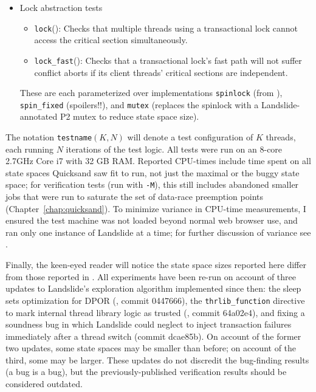 \begin{itemize}
\begin{itemize}
	\end{itemize}
	\item Lock abstraction tests
	\begin{itemize}
		\item {\tt lock}(): Checks that multiple threads using a transactional lock
			cannot access the critical section simultaneously.
		\item {\tt lock\_fast}(): Checks that a transactional lock's fast path will not suffer conflict aborts
			if its client threads' critical sections are independent.
	\end{itemize}
		These are each parameterized over implementations {\tt spinlock} (from \cite{spinlock-rtm-github}),
		{\tt spin\_\allowbreak{}fixed} (spoilers!!),
		and {\tt mutex} (replaces the spinlock with a Landslide-annotated P2 mutex to reduce state space size).
\end{itemize}

The notation {\tt testname}$(K,N)$ will denote a test configuration of $K$ threads, each running $N$ iterations of the test logic.
All tests were run on an 8-core 2.7GHz Core i7 with 32 GB RAM.
Reported CPU-times include time spent on all state spaces
Quicksand saw fit to run,
not just the maximal or the buggy state space;
for verification tests (run with {\tt -M}),
this still includes abandoned smaller jobs that were run to saturate the set of data-race preemption points
(Chapter~\ref{chap:quicksand}).
To minimize variance in CPU-time measurements,
I ensured the test machine was not loaded beyond normal web browser use,
and ran only one instance of Landslide at a time;
for further discussion of variance see \cite{sigbovik-htm}.

Finally, the keen-eyed reader will notice the state space sizes reported here
differ from those reported in \cite{sigbovik-htm}.
All experiments have been re-run
on account of three updates to Landslide's exploration algorithm
implemented since then:
the sleep sets optimization for DPOR (\sect{\ref{sec:landslide-explore}}, commit 0447666),
the {\tt thrlib\_function} directive
to mark internal thread library logic as trusted (\sect{\ref{sec:landslide-config-landslide}}, commit 64a02e4),
and fixing a soundness bug in which Landslide could neglect to inject transaction failures
immediately after a thread switch (commit dcae85b).
On account of the former two updates, some state spaces may be smaller than before;
on account of the third, some may be larger.
These updates do not discredit the bug-finding results (a bug is a bug),
but the previously-published verification results should be considered outdated.

